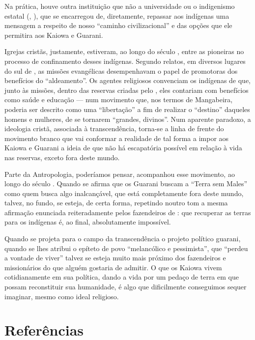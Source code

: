 Na prática, houve outra instituição que não a universidade ou o
indigenismo estatal (, ), que se encarregou de, diretamente,
repassar aos indígenas uma mensagem a respeito de nosso ``caminho
civilizacional'' e das opções que ele permitira aos Kaiowa e Guarani. 

Igrejas cristãs, justamente, estiveram, ao longo do século , entre as
pioneiras no processo de confinamento desses indígenas. Segundo
relatos, em diversos lugares do sul de , as missões evangélicas
desempenhavam o papel de promotoras dos benefícios do ``aldeamento''. Os
agentes religiosos convenciam os indígenas de que, junto às missões,
dentro das reservas criadas pelo , eles contariam com benefícios
como saúde e educação --- num movimento que, nos termos de Mangabeira,
poderia ser descrito como uma ``libertação'' a fim de realizar o
``destino'' daqueles homens e mulheres, de se tornarem ``grandes,
divinos''. Num aparente paradoxo, a ideologia cristã, associada à
transcendência, torna-se a linha de frente do movimento branco que vai
conformar a realidade de tal forma a impor aos Kaiowa e Guarani a ideia
de que não há escapatória possível em relação à vida nas reservas,
exceto fora deste mundo. 

Parte da Antropologia, poderíamos pensar, acompanhou esse movimento, ao
longo do século . Quando se afirma que os Guarani buscam a ``Terra sem
Males'' como quem busca algo inalcançável, que está completamente fora
deste mundo, talvez, no fundo, se esteja, de certa forma, repetindo
noutro tom a mesma afirmação enunciada reiteradamente pelos fazendeiros
de : que recuperar as terras para os indígenas é, ao final,
absolutamente impossível.

Quando se projeta para o campo da transcendência o projeto político
guarani, quando se lhes atribui o epíteto de povo ``melancólico e
pessimista'', que ``perdeu a vontade de viver'' talvez se esteja muito
mais próximo dos fazendeiros e missionários do que alguém gostaria de
admitir. O que os Kaiowa vivem cotidianamente em sua política, dando a
vida por um pedaço de terra em que possam reconstituir sua humanidade,
é algo que dificilmente conseguimos sequer imaginar, mesmo como ideal
religioso.

\section{Referências}

